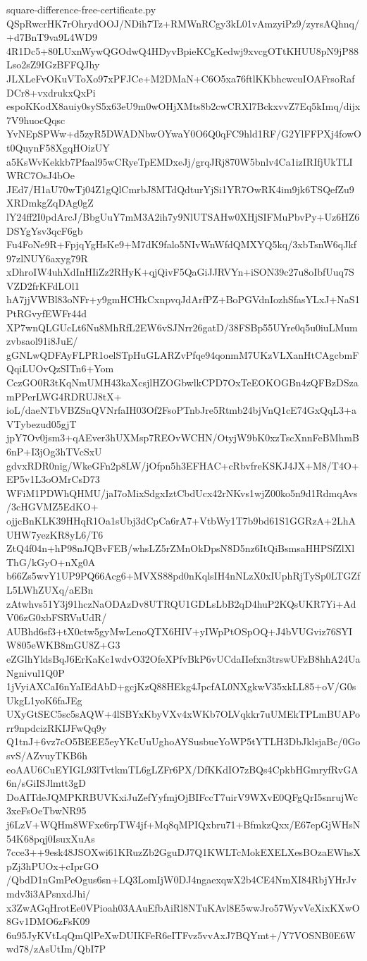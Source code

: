 \documentclass[11pt]{article}
\theoremstyle{definition}
\theoremstyle{remark}
\begin{document}
\begin{filecontents*}[overwrite]{square-difference-free-certificate.py}
QSpRwcrHK7rOhrydOOJ/NDih7Tz+RMWnRCgy3kL01vAmzyiPz9/zyrsAQhnq/+d7BnT9va9L4WD9
4R1Dc5+80LUxnWywQGOdwQ4HDyvBpieKCgKedwj9xvcgOTtKHUU8pN9jP88Lso2sZ9IGzBFFQJhy
JLXLeFvOKuVToXo97xPFJCe+M2DMaN+C6O5xa76ftlKKbhcwcuIOAFrsoRafDCr8+vxdrukxQxPi
espoKKodX8auiy0syS5x63eU9m0wOHjXMts8b2cwCRXl7BckxvvZ7Eq5kImq/dijx7V9huocQqsc
YvNEpSPWw+d5zyR5DWADNbwOYwaY0O6Q0qFC9hld1RF/G2YlFFPXj4fowOt0QuynF58XgqHOizUY
a5KsWvKekkb7Pfaal95wCRyeTpEMDxeJj/grqJRj870W5bnlv4Ca1izIRIfjUkTLIWRC7OsJ4bOe
JEd7/H1aU70wTj04Z1gQlCmrbJ8MTdQdturYjSi1YR7OwRK4im9jk6TSQefZu9XRDmkgZqDAg0gZ
lY24ff2I0pdArcJ/BbgUuY7mM3A2ih7y9NlUTSAHw0XHjSIFMuPbvPy+Uz6HZ6DSYgYsv3qcF6gb
Fu4FoNe9R+FpjqYgHsKe9+M7dK9falo5NIvWnWfdQMXYQ5kq/3xbTsnW6qJkf97zlNUY6axyg79R
xDhroIW4uhXdInHIiZz2RHyK+qjQivF5QaGiJJRVYn+iSON39c27u8oIbfUuq7SVZD2frKFdLOl1
hA7jjVWBl83oNFr+y9gmHCHkCxnpvqJdArfPZ+BoPGVdnIozhSfasYLxJ+NaS1PtRGvyfEWFr44d
XP7wnQLGUcLt6Nu8MhRfL2EW6vSJNrr26gatD/38FSBp55UYre0q5u0iuLMumzvbsaol91i8JuE/
gGNLwQDFAyFLPR1oelSTpHuGLARZvPfqe94qonmM7UKzVLXanHtCAgcbmFQqiLUOvQzSITn6+Yom
CczGO0R3tKqNmUMH43kaXcsjlHZOGbwlkCPD7OxTeEOKOGBn4zQFBzDSzamPPerLWG4RDRUJ8tX+
ioL/daeNTbVBZSnQVNrfaIH03Of2FsoPTnbJre5Rtmb24bjVnQ1cE74GxQqL3+aVTybezud05gjT
jpY7Ov0jsm3+qAEver3hUXMsp7REOvWCHN/OtyjW9bK0xzTscXnnFeBMhmB6nP+I3jOg3hTVcSxU
gdvxRDR0nig/WkeGFn2p8LW/jOfpn5h3EFHAC+cRbvfreKSKJ4JX+M8/T4O+EP5v1L3oOMrCsD73
WFiM1PDWhQHMU/jaI7oMixSdgxIztCbdUcx42rNKvs1wjZ00ko5n9d1RdmqAvs/3cHGVMZ5EdKO+
ojjcBnKLK39HHqR1Oa1sUbj3dCpCa6rA7+VtbWy1T7b9bd61S1GGRzA+2LhAUHW7yezKR8yL6/T6
ZtQ4f04n+hP98nJQBvFEB/whsLZ5rZMnOkDpsN8D5nz6ItQiBsmsaHHPSfZlXlThG/kGyO+nXg0A
b66Zs5wvY1UP9PQ66Acg6+MVXS88pd0nKqlsIH4nNLzX0xIUphRjTySp0LTGZfL5LWhZUXq/aEBn
zAtwhvs51Y3j91hczNaODAzDv8UTRQU1GDLsLbB2qD4huP2KQsUKR7Yi+AdV06zG0xbFSRVuUdR/
AUBhd6sf3+tX0ctw5gyMwLenoQTX6HIV+yIWpPtOSpOQ+J4bVUGviz76SYIW805eWKB8mGU8Z+G3
eZGlhYldsBqJ6ErKaKc1wdvO32OfeXPfvBkP6vUCdaIIefxn3trswUFzB8hhA24UaNgnivul1Q0P
1jVyiAXCaI6nYaIEdAbD+gcjKzQ88HEkg4JpcfAL0NXgkwV35xkLL85+oV/G0sUkgL1yoK6faJEg
UXyGtSEC5sc5sAQW+4lSBYxKbyVXv4xWKb7OLVqkkr7uUMEkTPLmBUAPorr9npdcizRKIJFwQq9y
Q1tnJ+6vz7cO5BEEE5eyYKcUuUghoAYSusbueYoWP5tYTLH3DbJklsjaBc/0GosvS/AZvuyTKB6h
eoAAU6CuEYIGL93lTvtkmTL6gLZFr6PX/DfKKdIO7zBQs4CpkbHGmryfRvGA6n/sGiISJlmtt3gD
DoAITdeJQMPKRBUVKxiJuZefYyfmjOjBIFccT7uirV9WXvE0QFgQrI5snrujWc3xeFsOeTbwNR95
j6LzV+WQHm8WFxe6rpTW4jf+Mq8qMPIQxbru71+BfmkzQxx/E67epGjWHsN54K68pqj0IsuxXuAs
7cce3++9esk48JSOXwi61KRuzZb2GguDJ7Q1KWLTcMokEXELXesBOzaEWhsXpZj3hPUOx+cIprGO
/QbdD1nGmPeOgus6sn+LQ3LomIjW0DJ4ngaexqwX2b4CE4NmXI84RbjYHrJvmdv3i3APsnxdJhi/
x3ZwAGqHrotEe0VPioah03AAuEfbAiRl8NTuKAvl8E5wwJro57WyvVeXixKXwO8Gv1DMO6zFsK09
6u95JyKVtLqQmQlPeXwDUIKFeR6eITFvz5vvAxJ7BQYmt+/Y7VOSNB0E6Wwd78/zAsUtIm/QbI7P

\end{filecontents*}
\end{document}
